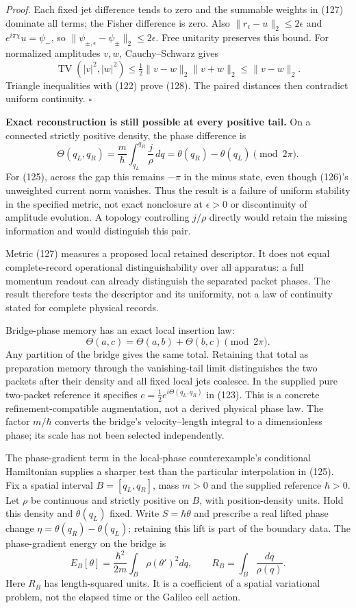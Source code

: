 \documentclass[11pt,a4paper]{article}
\begin{document}
\emph{Proof.} Each fixed jet difference tends to zero and the summable
weights in (127) dominate all terms; the Fisher difference is zero. Also
\(\|r_\epsilon-u\|_2\le2\epsilon\) and \(e^{i\pi\chi}u=\psi_-\), so
\(\|\psi_{\pm,\epsilon}-\psi_\pm\|_2\le2\epsilon\). Free unitarity
preserves this bound. For normalized amplitudes \(v,w\), Cauchy--Schwarz
gives \[\operatorname{TV}(|v|^2,|w|^2)
 \le\tfrac12\|v-w\|_2\|v+w\|_2\le\|v-w\|_2.\] Triangle inequalities with
(122) prove (128). The paired distances then contradict uniform
continuity. \(\square\)

\textbf{Exact reconstruction is still possible at every positive tail.}
On a connected strictly positive density, the phase difference is
\[\Theta(q_L,q_R)=\frac m\hbar\int_{q_L}^{q_R}\frac j\rho\,dq
 =\theta(q_R)-\theta(q_L)\pmod{2\pi}.\tag{129}\] For (125), across the
gap this remains \(-\pi\) in the minus state, even though (126)'s
unweighted current norm vanishes. Thus the result is a failure of
uniform stability in the specified metric, not exact nonclosure at
\(\epsilon>0\) or discontinuity of amplitude evolution. A topology
controlling \(j/\rho\) directly would retain the missing information and
would distinguish this pair.

Metric (127) measures a proposed local retained descriptor. It does not
equal complete-record operational distinguishability over all apparatus:
a full momentum readout can already distinguish the separated packet
phases. The result therefore tests the descriptor and its uniformity,
not a law of continuity stated for complete physical records.

Bridge-phase memory has an exact local insertion law:
\[\Theta(a,c)=\Theta(a,b)+\Theta(b,c)\pmod{2\pi}.\] Any partition of the
bridge gives the same total. Retaining that total as preparation memory
through the vanishing-tail limit distinguishes the two packets after
their density and all fixed local jets coalesce. In the supplied pure
two-packet reference it specifies \(c=\tfrac12e^{i\Theta(q_L,q_R)}\) in
(123). This is a concrete refinement-compatible augmentation, not a
derived physical phase law. The factor \(m/\hbar\) converts the bridge's
velocity--length integral to a dimensionless phase; its scale has not
been selected independently.

The phase-gradient term in the local-phase counterexample's conditional
Hamiltonian supplies a sharper test than the particular interpolation in
(125). Fix a spatial interval \(B=[q_L,q_R]\), mass \(m>0\) and the
supplied reference \(\hbar>0\). Let \(\rho\) be continuous and strictly
positive on \(B\), with position-density units. Hold this density and
\(\theta(q_L)\) fixed. Write \(S=\hbar\theta\) and prescribe a real
lifted phase change \(\eta=\theta(q_R)-\theta(q_L)\); retaining this
lift is part of the boundary data. The phase-gradient energy on the
bridge is \[E_B[\theta]=\frac{\hbar^2}{2m}\int_B\rho(\theta')^2dq,
\qquad R_B=\int_B\frac{dq}{\rho(q)}.\tag{130}\] Here \(R_B\) has
length-squared units. It is a coefficient of a spatial variational
problem, not the elapsed time or the Galileo cell action.
\end{document}
